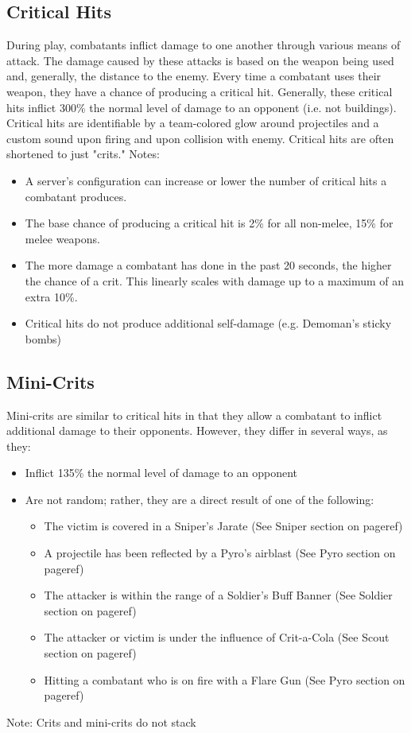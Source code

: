 \subsection{Critical Hits}
During play, combatants inflict damage to one another through various means of attack.  The damage caused by these attacks is based on the weapon being used and, generally, the distance to the enemy.  Every time a combatant uses their weapon, they have a chance of producing a critical hit.  Generally, these critical hits inflict 300\% the normal level of damage to an opponent (i.e. not buildings). Critical hits are identifiable by a team-colored glow around projectiles and a custom sound upon firing and upon collision with enemy.  Critical hits are often shortened to just "crits."
Notes:
\begin{itemize}
	\item A server's configuration can increase or lower the number of critical hits a combatant produces. 
	\item The base chance of producing a critical hit is 2\% for all non-melee, 15\% for melee weapons.
	\item The more damage a combatant has done in the past 20 seconds, the higher the chance of a crit. This linearly scales with damage up to a maximum of an extra 10\%. 
	\item Critical hits do not produce additional self-damage (e.g. Demoman's sticky bombs)
\end{itemize}

\subsection{Mini-Crits}
Mini-crits are similar to critical hits in that they allow a combatant to inflict additional damage to their opponents.  However, they differ in several ways, as they:
\begin{itemize}
	\item Inflict 135\% the normal level of damage to an opponent
	\item Are not random; rather, they are a direct result of one of the following:
		\begin{itemize}
			\item The victim is covered in a Sniper's Jarate (See Sniper section on {{pageref}})
			\item A projectile has been reflected by a Pyro's airblast (See Pyro section on {{pageref}})
			\item The attacker is within the range of a Soldier's Buff Banner (See Soldier section on {{pageref}})
			\item The attacker or victim is under the influence of Crit-a-Cola (See Scout section on {{pageref}})
			\item Hitting a combatant who is on fire with a Flare Gun (See Pyro section on {{pageref}})
		\end{itemize}
\end{itemize}
Note: Crits and mini-crits do not stack


